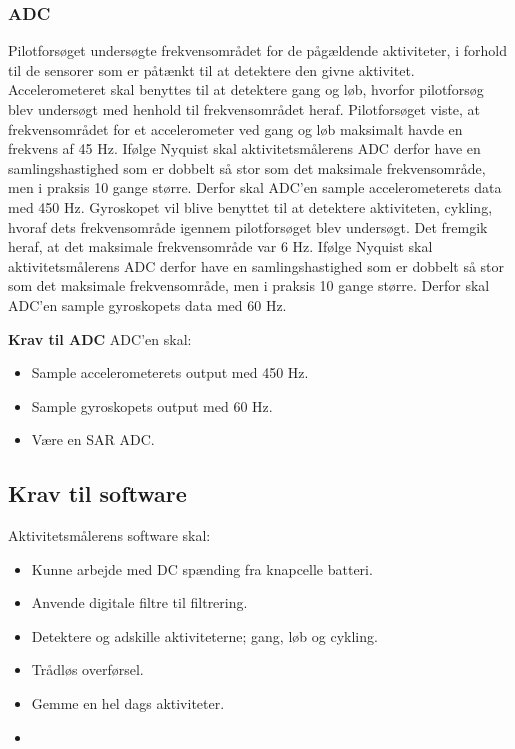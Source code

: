 \subsubsection{ADC}
Pilotforsøget undersøgte frekvensområdet for de pågældende aktiviteter, i forhold til de sensorer som er påtænkt til at detektere den givne aktivitet.\newline
Accelerometeret skal benyttes til at detektere gang og løb, hvorfor pilotforsøg blev undersøgt med henhold til frekvensområdet heraf. Pilotforsøget viste, at frekvensområdet for et accelerometer ved gang og løb maksimalt havde en frekvens af 45 Hz. Ifølge Nyquist skal aktivitetsmålerens ADC derfor have en samlingshastighed som er dobbelt så stor som det maksimale frekvensområde, men i praksis 10 gange større. Derfor skal ADC'en sample accelerometerets data med 450 Hz.\newline
Gyroskopet vil blive benyttet til at detektere aktiviteten, cykling, hvoraf dets frekvensområde igennem pilotforsøget blev undersøgt. Det fremgik heraf, at det maksimale frekvensområde var 6 Hz. Ifølge Nyquist skal aktivitetsmålerens ADC derfor have en samlingshastighed som er dobbelt så stor som det maksimale frekvensområde, men i praksis 10 gange større. Derfor skal ADC'en sample gyroskopets data med 60 Hz.

\textbf{Krav til ADC} \newline
ADC'en skal:
\begin{itemize}
\item Sample accelerometerets output med 450 Hz.
\item Sample gyroskopets output med 60 Hz. 
\item Være en SAR ADC. 
\end{itemize}



\subsection{Krav til software}


Aktivitetsmålerens software skal:
\begin{itemize}
\item Kunne arbejde med DC spænding fra knapcelle batteri.
\item Anvende digitale filtre til filtrering.
\item Detektere og adskille aktiviteterne; gang, løb og cykling. 
\item Trådløs overførsel.
\item Gemme en hel dags aktiviteter. 
\item 
\end{itemize}
